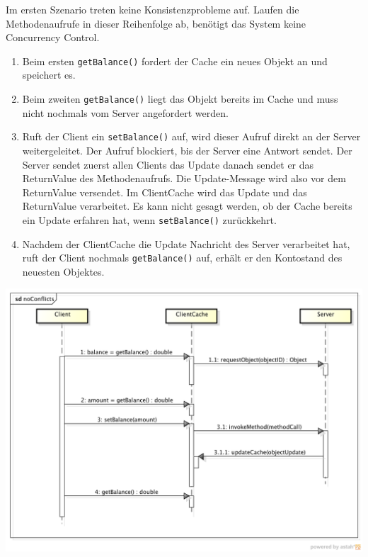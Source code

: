 Im ersten Szenario treten keine Konsistenzprobleme auf. Laufen die Methodenaufrufe in dieser Reihenfolge ab, benötigt das System keine Concurrency Control.
\begin{enumerate}
\item Beim ersten \verb|getBalance()| fordert der Cache ein neues Objekt an und speichert es.
\item Beim zweiten \verb|getBalance()|  liegt das Objekt bereits im Cache und muss nicht nochmals vom Server angefordert werden.
\item Ruft der Client ein \verb|setBalance()| auf, wird dieser Aufruf direkt an der Server weitergeleitet. Der Aufruf blockiert, bis der Server eine Antwort sendet. Der Server sendet zuerst allen Clients das Update danach sendet er das ReturnValue des Methodenaufrufs. Die Update-Message wird also vor dem ReturnValue versendet. Im ClientCache wird das Update und das ReturnValue verarbeitet. Es kann nicht gesagt werden, ob der Cache bereits ein Update erfahren hat, wenn  \verb|setBalance()|  zurückkehrt.
\item Nachdem der ClientCache die Update Nachricht des Server verarbeitet hat, ruft der Client nochmals \verb|getBalance()| auf, erhält er den Kontostand des neuesten Objektes.
\end{enumerate}

\includegraphics[scale=0.3]{image_testFramework/conflictscenario_noconflict}


